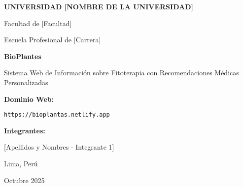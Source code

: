\documentclass[12pt,a4paper]{article}
\begin{document}
\begin{titlepage}
    \centering
    \vspace*{2cm}
    
    {\LARGE\bfseries UNIVERSIDAD [NOMBRE DE LA UNIVERSIDAD]\par}
    \vspace{0.5cm}
    {\Large Facultad de [Facultad]\par}
    \vspace{0.3cm}
    {\Large Escuela Profesional de [Carrera]\par}
    
    \vspace{3cm}
    
    {\Huge\bfseries BioPlantes\par}
    \vspace{0.5cm}
    {\LARGE Sistema Web de Información sobre Fitoterapia con Recomendaciones Médicas Personalizadas\par}
    
    \vspace{3cm}
    
    {\Large\textbf{Dominio Web:}\par}
    \vspace{0.3cm}
    {\Large\texttt{https://bioplantas.netlify.app}\par}
    
    \vspace{2cm}
    
    {\large\textbf{Integrantes:}\par}
    \vspace{0.5cm}
    {\large
    [Apellidos y Nombres - Integrante 1]\par
    [Apellidos y Nombres - Integrante 2]\par
    [Apellidos y Nombres - Integrante 3]\par
    [Apellidos y Nombres - Integrante 4]\par
    }
    
    \vfill
    
    {\large Lima, Perú\par}
    {\large Octubre 2025\par}
    
\end{titlepage}

\newpage
{}
\setcounter{page}{2}
\end{document}
